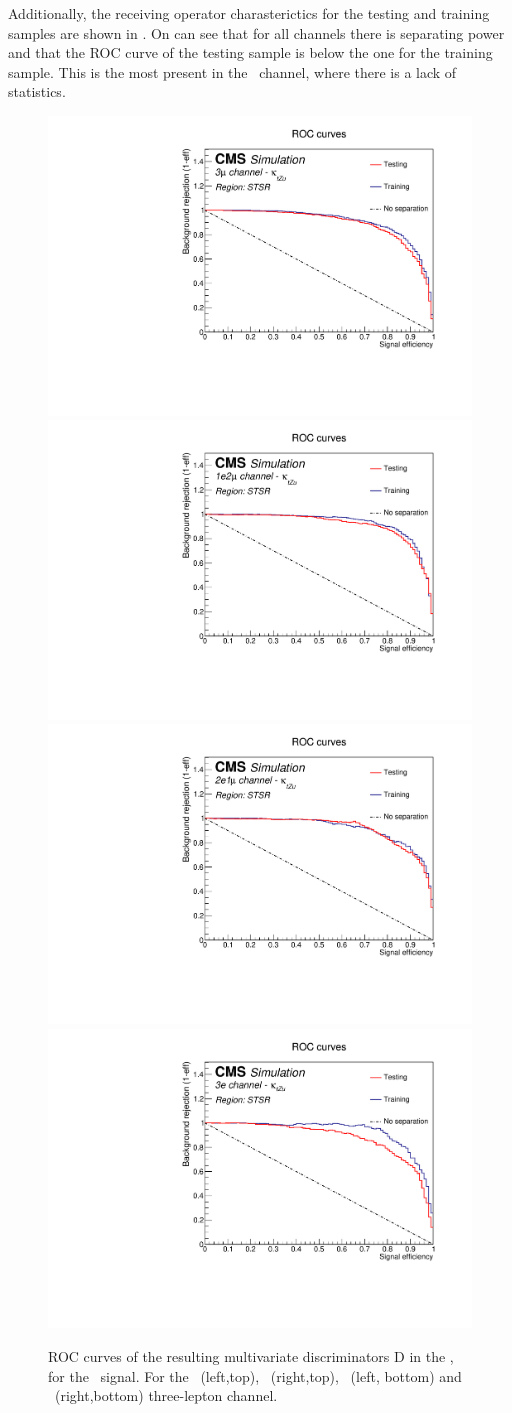 Additionally, the receiving operator charasterictics for the testing and training samples are shown in . On can see that for all channels there is separating power and that the ROC curve of the testing sample is below the one for the training sample. This is the most present in the \eee\ channel, where there is a lack of statistics. 
\begin{figure}[htbp]
	\centering
	\includegraphics[width=0.49\linewidth]{6_Search/Figures/PlotsTechnics/ROCZutsingletopuuu}
	\includegraphics[width=0.49\linewidth]{6_Search/Figures/PlotsTechnics/ROCZutsingletopuue}
	\includegraphics[width=0.49\linewidth]{6_Search/Figures/PlotsTechnics/ROCZutsingletopeeu}
	\includegraphics[width=0.49\linewidth]{6_Search/Figures/PlotsTechnics/ROCZutsingletopeee}
	\caption{ROC curves of the resulting  multivariate discriminators D in the \STSR, for the \Zut\ signal. For the \mumumu\ (left,top), \emumu\ (right,top), \eemu\ (left, bottom) and \eee\ (right,bottom) three-lepton channel.}
	\label{fig:roczutsingletop}
\end{figure}




